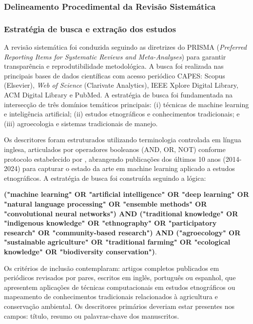 \subsubsection*{Delineamento Procedimental da Revisão Sistemática}

\subsubsection*{Estratégia de busca e extração dos estudos}

A revisão sistemática foi conduzida seguindo as diretrizes do PRISMA (\textit{Preferred Reporting Items for Systematic Reviews and Meta-Analyses}) para garantir transparência e reprodutibilidade metodológica. A busca foi realizada nas principais bases de dados científicas com acesso periódico CAPES: Scopus (Elsevier), \textit{Web of Science} (Clarivate Analytics), IEEE Xplore Digital Library, ACM Digital Library e PubMed. A estratégia de busca foi fundamentada na intersecção de três domínios temáticos principais: (i) técnicas de machine learning e inteligência artificial; (ii) estudos etnográficos e conhecimentos tradicionais; e (iii) agroecologia e sistemas tradicionais de manejo.

Os descritores foram estruturados utilizando terminologia controlada em língua inglesa, articulados por operadores booleanos (AND, OR, NOT) conforme protocolo estabelecido por , abrangendo publicações dos últimos 10 anos (2014-2024) para capturar o estado da arte em machine learning aplicado a estudos etnográficos. A estratégia de busca foi construída seguindo a lógica: 

\textbf{("machine learning" OR "artificial intelligence" OR "deep learning" OR "natural language processing" OR "ensemble methods" OR "convolutional neural networks") AND ("traditional knowledge" OR "indigenous knowledge" OR "ethnography" OR "participatory research" OR "community-based research") AND ("agroecology" OR "sustainable agriculture" OR "traditional farming" OR "ecological knowledge" OR "biodiversity conservation")}.

Os critérios de inclusão contemplaram: artigos completos publicados em periódicos revisados por pares, escritos em inglês, português ou espanhol, que apresentem aplicações de técnicas computacionais em estudos etnográficos ou mapeamento de conhecimentos tradicionais relacionados à agricultura e conservação ambiental. Os descritores primários deveriam estar presentes nos campos: título, resumo ou palavras-chave dos manuscritos.

